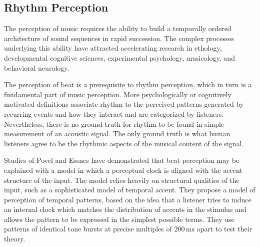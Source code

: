 \documentclass{scrartcl}
\begin{document}





\subsection{Rhythm Perception}

The perception of music requires the ability to build a temporally ordered architecture of sound sequences in rapid succession. The complex processes underlying this ability have attracted accelerating research in ethology, developmental cognitive sciences, experimental psychology, musicology, and behavioral neurology.

The perception of beat is a prerequisite to rhythm perception, which in turn is a fundamental part of music perception. More psychologically or cognitively motivated definitions associate rhythm to the perceived patterns generated by recurring events and how they interact and are categorized by listeners. Nevertheless, there is no ground truth for rhythm to be found in simple measurement of an acoustic signal. The only ground truth is what human listeners agree to be the rhythmic aspects of the musical content of the signal.

Studies of Povel and Essnes \cite{Povel1985} have demonstrated that beat perception may be explained with a model in which a perceptual clock is aligned with the accent structure of the input. The model relies heavily on structural qualities of the input, such as a sophisticated model of temporal accent. They propose a model of perception of temporal patterns, based on the idea that a listener tries to induce an internal clock which matches the distribution of accents in the stimulus and allows the pattern to be expressed in the simplest possible terms. They use patterns of identical tone bursts at precise multiples of $200\, \text{ms}$ apart to test their theory. 
\end{document}
